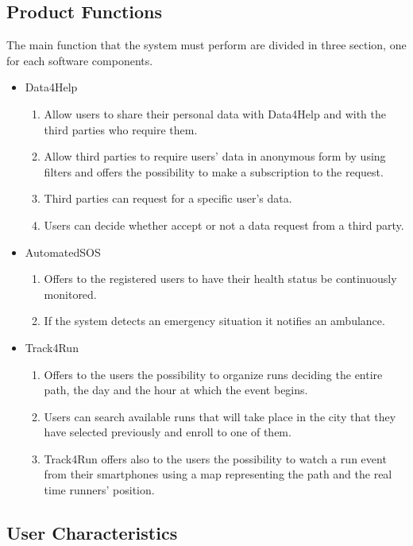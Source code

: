 \documentclass[a4paper]{article}
\begin{document}
    \subsection{Product Functions}
    The main function that the system must perform are divided in three section, one for each software components.
    \begin{itemize}
        \item Data4Help
        \begin{enumerate}
            \item Allow users to share their personal data with Data4Help and with the third parties who require them.
            \item Allow third parties to require users' data in anonymous form by using filters and offers the possibility to make a subscription to the request.
            \item Third parties can request for a specific user's data.
            \item Users can decide whether accept or not a data request from a third party.
        \end{enumerate}
        \item AutomatedSOS
        \begin{enumerate}
            \item Offers to the registered users to have their health status be continuously monitored.
            \item If the system detects an emergency situation it notifies an ambulance.
        \end{enumerate}
        \item Track4Run
        \begin{enumerate}
            \item Offers to the users the possibility to organize runs deciding the entire path, the day and the hour at which the event begins.
            \item Users can search available runs that will take place in the city that they have selected previously and enroll to one of them.
            \item Track4Run offers also to the users the possibility to watch a run event from their smartphones using a map representing the path and the real time runners' position.
        \end{enumerate}
    \end{itemize}
    
    
    \subsection{User Characteristics}
    
\end{document}
